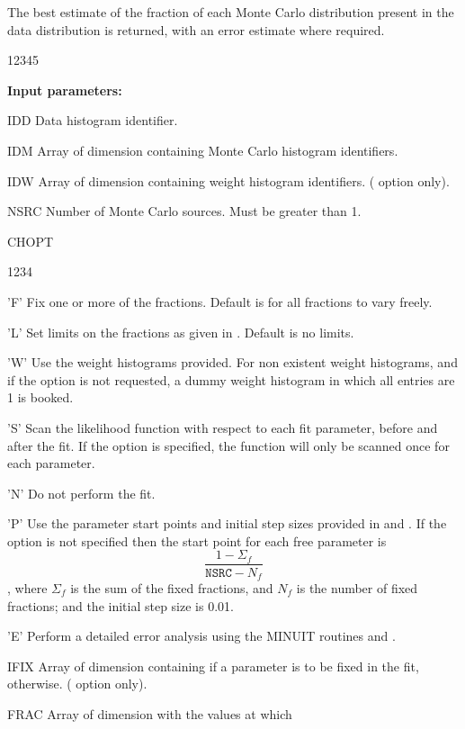 The best estimate of the fraction of each Monte
Carlo distribution present in the data distribution is returned, with an
error estimate where required.
 
\begin{DLtt}{12345}
\item[{\rm\bf Input parameters:}]
\item[IDD] Data histogram identifier.
\item[IDM] Array of dimension  containing Monte Carlo histogram
identifiers.
\item[IDW] Array of dimension  containing weight histogram
identifiers. ( option only).
\item[NSRC] Number of Monte Carlo sources.  Must be greater than 1.
\item[CHOPT]
\begin{DLtt}{1234}
\item['F'] Fix one or more of the fractions.  Default is for all fractions
to vary freely.
\item['L'] Set limits on the fractions as given in .  Default
is no limits.
\item['W'] Use the weight histograms provided.  For non existent weight
histograms, and if the  option is not requested, a dummy weight
histogram in which all entries are 1 is booked.
\item['S'] Scan the likelihood function with respect to each fit parameter,
before and after the fit.  If the  option is specified, the function
will only be scanned once for each parameter.
\item['N'] Do not perform the fit.
\item['P'] Use the parameter start points and initial step sizes provided
in  and .
If the  option is
not specified then the start point for each free parameter is
\[ \frac{1 - \Sigma_{f}}{\mathtt{NSRC}-N_{f}} \], where $\Sigma_{f}$ is the sum
of the fixed fractions, and $N_{f}$ is the number of fixed fractions;
and the initial step size is 0.01.
\item['E'] Perform a detailed error analysis using the MINUIT routines
 and .
\end{DLtt}
\item[IFIX] Array of dimension  containing  if a
parameter is to be fixed in the fit,  otherwise. ( option
only).
\item[FRAC] Array of dimension  with the values at which

\end{DLtt}
